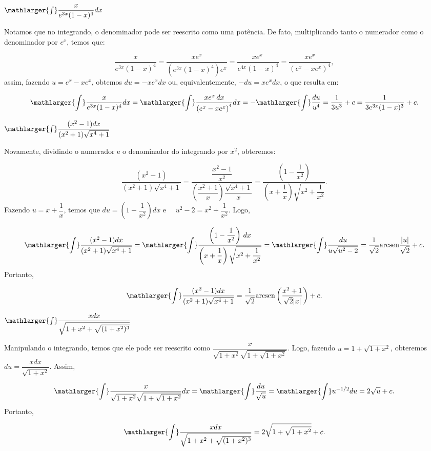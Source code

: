 \cleardoublepage\documentclass[../main.tex]{subfiles}
\begin{document}
\begin{exeresol}
  \begin{compactenum}[a)]
  \item \(\mathlarger{\int}\dfrac{x}{e^{3x}(1-x)^4} dx\)\\
 
  \begin{solution}
   Notamos que no integrando, o denominador pode ser reescrito como uma potência. De fato, multiplicando tanto o numerador como o denominador por \(e^x\), temos que:

\[ \dfrac{x}{e^{3x}(1-x)^4} =\dfrac{xe^x}{(e^{3x}(1-x)^4)e^x} =\dfrac{xe^x\,}{e^{4x}(1-x)^4}=\dfrac{xe^x}{(e^x-xe^x)^4}, \]
assim, fazendo \(u=e^x-xe^x\), obtemos \(du=-xe^x dx\) ou, equivalentemente, \(-du=xe^x dx\), o que resulta em:

\[ \mathlarger{\int}\dfrac{x}{e^{3x}(1-x)^4} dx=\mathlarger{\int}\dfrac{xe^x \,dx}{\left(e^{x}-xe^x \right)^4} dx =-\mathlarger{\int}\dfrac{du}{u^4}=\dfrac{1}{3u^3}+c = \dfrac{1}{3e^{3x}(1-x)^3} +c. \]
  \end{solution}
  \item \( \mathlarger{\int} \dfrac{(x^2-1)dx}{(x^2+1)\sqrt{x^4+1}}\)\\
  
  \begin{solution}
  Novamente, dividindo o numerador e o denominador do integrando por \(x^2\), obteremos:

\[ \dfrac{(x^2-1)}{(x^2+1)\sqrt{x^4+1}}=\dfrac{\dfrac{x^2-1}{x^2}}{\left(\dfrac{x^2+1}{x}\right)\dfrac{\sqrt{x^4+1}}{x}} = \dfrac{\left(1 -\dfrac{1}{x^2}\right)}{\left( x+\dfrac{1}{x}\right)\sqrt{x^2+\dfrac{1}{x^2}}}. \]
Fazendo \(u=x+\dfrac{1}{x}\), temos que \(du=\left(1 -\dfrac{1}{x^2}\right)dx\) e \(\quad u^2-2=x^2+\dfrac{1}{x^2}\). Logo,

\[ \mathlarger{\int} \dfrac{(x^2-1)dx}{(x^2+1)\sqrt{x^4+1}} = \mathlarger{\int} \dfrac{\left(1 -\dfrac{1}{x^2}\right)\,dx}{\left( x+\dfrac{1}{x}\right)\sqrt{x^2+\dfrac{1}{x^2}}} =\mathlarger{\int}\dfrac{du}{u\sqrt{u^2-2}}=\dfrac{1}{\sqrt{2}}{\rm arcsen}\dfrac{|u|}{\sqrt{2}}+c. \]
Portanto,

\[ \mathlarger{\int} \dfrac{(x^2-1)dx}{(x^2+1)\sqrt{x^4+1}}=\dfrac{1}{\sqrt{2}}{\rm arcsen}\left(\dfrac{x^2+1}{\sqrt{2}|x|} \right)+c. \]
  \end{solution}
  \item \(\mathlarger{\int} \dfrac{x dx}{\sqrt{1+x^2+\sqrt{(1+x^2)^3}}}\)
  
  \begin{solution}
  Manipulando o integrando, temos que ele pode ser reescrito como \(\dfrac{x}{\sqrt{1+x^2}\sqrt{1 +\sqrt{1+x^2}}}\). Logo, fazendo \(u=1 +\sqrt{1+x^2}\), obteremos \(du=\dfrac{x dx}{\sqrt{1+x^2}}\). Assim,

\[ \mathlarger{\int} \dfrac{x}{\sqrt{1+x^2}\sqrt{1 +\sqrt{1+x^2}}}dx= \mathlarger{\int} \dfrac{du}{\sqrt{u}}= \mathlarger{\int} u^{-1/2}du = 2\sqrt{u}+c. \]
Portanto,

\[ \mathlarger{\int} \dfrac{x dx}{\sqrt{1+x^2+\sqrt{(1+x^2)^3}}}= 2\sqrt{1 +\sqrt{1+x^2}} +c. \]
  \end{solution}
  \end{compactenum}
\end{exeresol}
\end{document}
